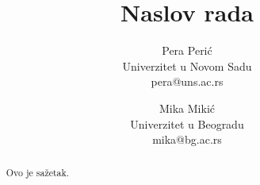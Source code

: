 \documentclass[11pt]{article}
\title{Naslov rada}
\author{
	Pera Peri\' c \\
	Univerzitet u Novom Sadu \\
	pera@uns.ac.rs
	\and
	Mika Miki\' c \\
	Univerzitet u Beogradu \\
	mika@bg.ac.rs
}
\begin{document}
	\maketitle

	\begin{abstract}
		Ovo je sa\v zetak.
	\end{abstract}
\end{document}
